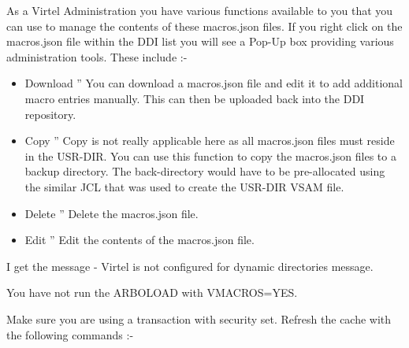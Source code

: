 \documentclass[letterpaper,10pt,english]{sphinxmanual}
\begin{document}
As a Virtel Administration you have various functions available to you that you can use to manage the contents of these macros.json files. If you right click on the macros.json file within the DDI list you will see a Pop-Up box providing various administration tools. These include :-

\begin{itemize}
\item {} 
Download ” You can download a macros.json file and edit it to add additional macro entries manually. This can then be uploaded back into the DDI repository.

\item {} 
Copy ” Copy is not really applicable here as all macros.json files must reside in the USR-DIR. You can use this function to copy the macros.json files to a backup directory. The back-directory would have to be pre-allocated using the similar JCL that was used to create the USR-DIR VSAM file.

\item {} 
Delete ” Delete the macros.json file.

\item {} 
Edit ” Edit the contents of the macros.json file.

\end{itemize}



I get the message - Virtel is not configured for dynamic directories message.



You have not run the ARBOLOAD with VMACROS=YES.


Make sure you are using a transaction with security set. Refresh the cache with the following commands :-

\begin{sphinxVerbatim}[commandchars=\\\{\}]
 
\end{sphinxVerbatim}
\end{document}
